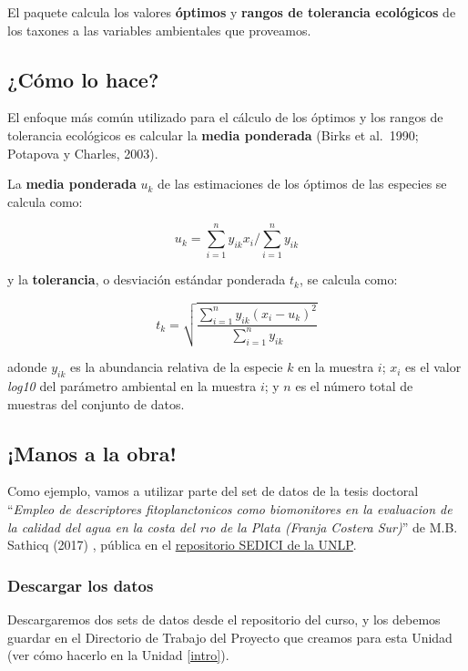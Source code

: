 \documentclass[
]{book}
\begin{document}
El paquete calcula los valores \textbf{óptimos} y \textbf{rangos de tolerancia ecológicos} de los taxones a las variables ambientales que proveamos.

\hypertarget{cuxf3mo-lo-hace}{%
\subsection{¿Cómo lo hace?}\label{cuxf3mo-lo-hace}}

El enfoque más común utilizado para el cálculo de los óptimos y los rangos de tolerancia ecológicos es calcular la \textbf{media ponderada} (Birks et al.~1990; Potapova y Charles, 2003).

La \textbf{media ponderada} \(u_{k}\) de las estimaciones de los óptimos de las especies se calcula como:

\[
u_{k} =\sum_{i=1}^{n} y_{ik}x_{i}/\sum_{i=1}^{n}y_{ik}
\]

y la \textbf{tolerancia}, o desviación estándar ponderada \(t_{k}\), se calcula como:

\[
t_{k} = \sqrt{\frac{\sum_{i=1}^{n} y_{ik} (x_{i} - u_{k})^2}{\sum_{i=1}^{n} y_{ik}}}
\]

adonde \(y_{ik}\) es la abundancia relativa de la especie \(k\) en la muestra \(i\); \(x_{i}\) es el valor \emph{log10} del parámetro ambiental en la muestra \(i\); y \(n\) es el número total de muestras del conjunto de datos.

\hypertarget{manos-a-la-obra-2}{%
\subsection{¡Manos a la obra!}\label{manos-a-la-obra-2}}

Como ejemplo, vamos a utilizar parte del set de datos de la tesis doctoral ``\emph{Empleo de descriptores fitoplanctonicos como biomonitores en la evaluacion de la calidad del agua en la costa del rıo de la Plata (Franja Costera Sur)}'' de M.B. Sathicq (2017) \citep{sathicq2017}, pública en el \href{http://sedici.unlp.edu.ar/handle/10915/58915}{repositorio SEDICI de la UNLP}.

\hypertarget{descargar-los-datos-1}{%
\subsubsection{\texorpdfstring{\textbf{Descargar los datos}}{Descargar los datos}}\label{descargar-los-datos-1}}

Descargaremos dos sets de datos desde el repositorio del curso, y los debemos guardar en el Directorio de Trabajo del Proyecto que creamos para esta Unidad (ver cómo hacerlo en la Unidad \ref{intro}).
\end{document}
